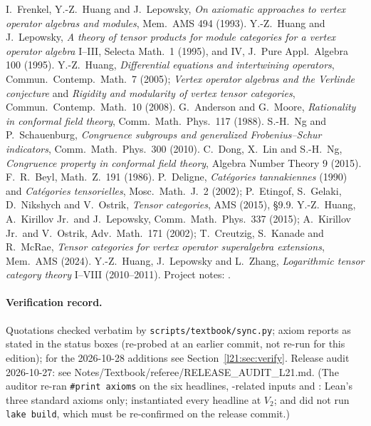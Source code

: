 I.~Frenkel, Y.-Z.~Huang and J.~Lepowsky, \emph{On axiomatic approaches to vertex operator algebras and modules}, Mem.\ AMS 494
(1993). Y.-Z.~Huang and J.~Lepowsky, \emph{A theory of tensor products for module categories for a vertex operator algebra}
I--III, Selecta Math.\ 1 (1995), and IV, J.\ Pure Appl.\ Algebra 100 (1995). Y.-Z.~Huang, \emph{Differential equations and
intertwining operators}, Commun.\ Contemp.\ Math.\ 7 (2005); \emph{Vertex operator algebras and the Verlinde conjecture} and
\emph{Rigidity and modularity of vertex tensor categories}, Commun.\ Contemp.\ Math.\ 10 (2008). G.~Anderson and G.~Moore,
\emph{Rationality in conformal field theory}, Comm.\ Math.\ Phys.\ 117 (1988). S.-H.~Ng and P.~Schauenburg, \emph{Congruence
subgroups and generalized Frobenius--Schur indicators}, Comm.\ Math.\ Phys.\ 300 (2010). C.~Dong, X.~Lin and S.-H.~Ng,
\emph{Congruence property in conformal field theory}, Algebra Number Theory 9 (2015). F.~R.~Beyl, Math.\ Z.\ 191 (1986).
P.~Deligne, \emph{Catégories tannakiennes} (1990) and \emph{Catégories tensorielles}, Mosc.\ Math.\ J.\ 2 (2002); P.~Etingof,
S.~Gelaki, D.~Nikshych and V.~Ostrik, \emph{Tensor categories}, AMS (2015), §9.9. Y.-Z.~Huang, A.~Kirillov Jr.\ and
J.~Lepowsky, Comm.\ Math.\ Phys.\ 337 (2015); A.~Kirillov Jr.\ and V.~Ostrik, Adv.\ Math.\ 171 (2002); T.~Creutzig,
S.~Kanade and R.~McRae, \emph{Tensor categories for vertex operator superalgebra extensions}, Mem.\ AMS (2024). Y.-Z.~Huang,
J.~Lepowsky and L.~Zhang, \emph{Logarithmic tensor category theory} I--VIII (2010--2011). Project notes:
.

\paragraph{Verification record.} Quotations checked verbatim by \texttt{scripts/textbook/sync.py}; axiom reports as stated
in the status boxes (re-probed at an earlier commit, not re-run for this edition); for the 2026-10-28 additions see Section~\ref{l21:sec:verify}.
Release audit 2026-10-27: see Notes/Textbook/referee/RELEASE\_AUDIT\_L21.md. (The auditor re-ran \texttt{\#print axioms}
on the six headlines, -related inputs and : Lean's three standard axioms
only; instantiated every headline at $V_2$; and did not run \texttt{lake build}, which must be re-confirmed on the
release commit.)

\endgroup
